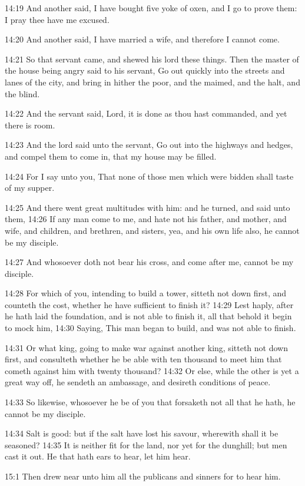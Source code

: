 14:19 And another said, I have bought five yoke of oxen, and I go to prove them: I pray thee have me excused.

14:20 And another said, I have married a wife, and therefore I cannot come.

14:21 So that servant came, and shewed his lord these things. Then the master of the house being angry said to his servant, Go out quickly into the streets and lanes of the city, and bring in hither the poor, and the maimed, and the halt, and the blind.

14:22 And the servant said, Lord, it is done as thou hast commanded, and yet there is room.

14:23 And the lord said unto the servant, Go out into the highways and hedges, and compel them to come in, that my house may be filled.

14:24 For I say unto you, That none of those men which were bidden shall taste of my supper.

14:25 And there went great multitudes with him: and he turned, and said unto them, 14:26 If any man come to me, and hate not his father, and mother, and wife, and children, and brethren, and sisters, yea, and his own life also, he cannot be my disciple.

14:27 And whosoever doth not bear his cross, and come after me, cannot be my disciple.

14:28 For which of you, intending to build a tower, sitteth not down first, and counteth the cost, whether he have sufficient to finish it?  14:29 Lest haply, after he hath laid the foundation, and is not able to finish it, all that behold it begin to mock him, 14:30 Saying, This man began to build, and was not able to finish.

14:31 Or what king, going to make war against another king, sitteth not down first, and consulteth whether he be able with ten thousand to meet him that cometh against him with twenty thousand?  14:32 Or else, while the other is yet a great way off, he sendeth an ambassage, and desireth conditions of peace.

14:33 So likewise, whosoever he be of you that forsaketh not all that he hath, he cannot be my disciple.

14:34 Salt is good: but if the salt have lost his savour, wherewith shall it be seasoned?  14:35 It is neither fit for the land, nor yet for the dunghill; but men cast it out. He that hath ears to hear, let him hear.

15:1 Then drew near unto him all the publicans and sinners for to hear him.

